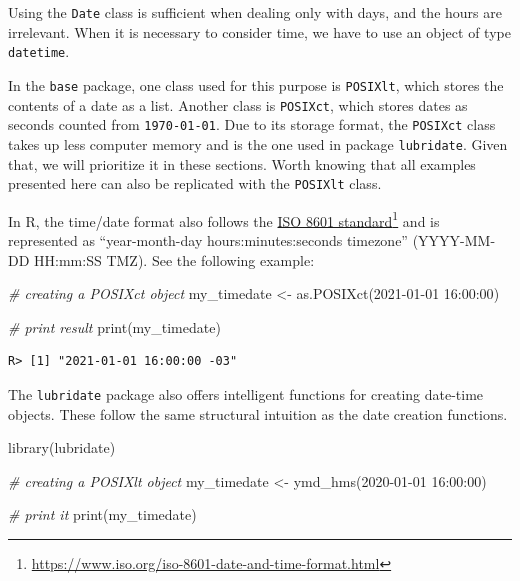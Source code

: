 \documentclass[
  12pt,
]{book}
\newenvironment{Shaded}{\begin{snugshade}}{\end{snugshade}}
\newcommand{\CommentTok}[1]{\textcolor[rgb]{0.37,0.37,0.37}{\textit{#1}}}
\newcommand{\FunctionTok}[1]{\textcolor[rgb]{0,0,0}{#1}}
\newcommand{\NormalTok}[1]{#1}
\newcommand{\OtherTok}[1]{\textcolor[rgb]{0.37,0.37,0.37}{#1}}
\newcommand{\StringTok}[1]{\textcolor[rgb]{0.5,0.5,0.5}{#1}}
\begin{document}
Using the \texttt{Date} class is sufficient when dealing only with days, and the hours are irrelevant. When it is necessary to consider time, we have to use an object of type \texttt{datetime}. 

In the \texttt{base} package, one class used for this purpose is \texttt{POSIXlt}, which stores the contents of a date as a list. Another class is \texttt{POSIXct}, which stores dates as seconds counted from \texttt{1970-01-01}. Due to its storage format, the \texttt{POSIXct} class takes up less computer memory and is the one used in package \texttt{lubridate}. Given that, we will prioritize it in these sections. Worth knowing that all examples presented here can also be replicated with the \texttt{POSIXlt} class.

In R, the time/date format also follows the \href{https://www.iso.org/iso-8601-date-and-time-format.html}{ISO 8601 standard}\footnote{\url{https://www.iso.org/iso-8601-date-and-time-format.html}} and is represented as ``year-month-day hours:minutes:seconds timezone'' (YYYY-MM-DD HH:mm:SS TMZ). See the following example:

\begin{Shaded}
\begin{Highlighting}[]
\CommentTok{\# creating a POSIXct object}
\NormalTok{my\_timedate }\OtherTok{\textless{}{-}} \FunctionTok{as.POSIXct}\NormalTok{(}\StringTok{\textquotesingle{}2021{-}01{-}01 16:00:00\textquotesingle{}}\NormalTok{)}

\CommentTok{\# print result}
\FunctionTok{print}\NormalTok{(my\_timedate)}
\end{Highlighting}
\end{Shaded}

\begin{verbatim}
R> [1] "2021-01-01 16:00:00 -03"
\end{verbatim}

The \texttt{lubridate} package also offers intelligent functions for creating date-time objects. These follow the same structural intuition as the date creation functions.

\begin{Shaded}
\begin{Highlighting}[]
\FunctionTok{library}\NormalTok{(lubridate)}

\CommentTok{\# creating a POSIXlt object}
\NormalTok{my\_timedate }\OtherTok{\textless{}{-}} \FunctionTok{ymd\_hms}\NormalTok{(}\StringTok{\textquotesingle{}2020{-}01{-}01 16:00:00\textquotesingle{}}\NormalTok{)}

\CommentTok{\# print it}
\FunctionTok{print}\NormalTok{(my\_timedate)}
\end{Highlighting}
\end{Shaded}
\end{document}
